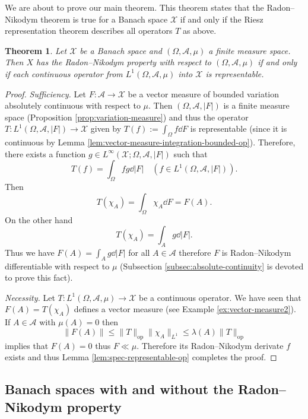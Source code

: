 \documentclass[a4paper, 12pt]{article}
\newtheorem{theo}[lem]{Theorem}
\begin{document}
We are about to prove our main theorem. This theorem states that the Radon\---Nikodym theorem is true for a Banach space $\mathcal{X}$ if and only if the Riesz representation theorem describes all operators $T$ as above.
\begin{theo}\label{theo:main-result} Let $\mathcal{X}$ be a Banach space and $(\Omega, \mathcal{A}, \mu)$ a finite measure space. Then $X$ has the Radon\---Nikodym property with respect to $(\Omega, \mathcal{A}, \mu)$ if and only if each continuous operator from $L^1(\Omega, \mathcal{A}, \mu)$ into $\mathcal{X}$ is representable.
\end{theo}
\begin{proof}
\emph{Sufficiency.} Let $F \colon \mathcal{A} \to \mathcal{X}$ be a vector measure of bounded variation absolutely continuous with respect to $\mu$. Then $(\Omega, \mathcal{A},|F|)$ is a finite measure space (Proposition \ref{prop:variation-measure}) and thus the operator $T\colon L^1(\Omega, \mathcal{A},|F|) \to \mathcal{X}$  given by $T(f) := \int_{\Omega} f \dd{F}$ is representable (since it is continuous by Lemma \ref{lem:vector-measure-integration-bounded-op}). Therefore, there exists a function $g \in L^\infty(\mathcal{X} ;\Omega, \mathcal{A},|F|)$ such that
$$T(f)= \int_{\Omega} f g \dd{|F|} \quad (f \in L^1(\Omega, \mathcal{A},|F|)).$$
Then 
$$T(\chi_A) = \int_{\Omega} \chi_A \dd{F} = F(A).$$
On the other hand
$$T(\chi_A) = \int_{A} g \dd{|F|}.$$
Thus we have $F(A) = \int_{A} g \dd{|F|}$ for all $A \in \mathcal{A}$ therefore $F$ is Radon\---Nikodym differentiable with respect to $\mu$ (Subsection \ref{subsec:absolute-continuity} is devoted to prove this fact).

\emph{Necessity.} Let $T \colon L^1(\Omega, \mathcal{A}, \mu) \to \mathcal{X}$ be a continuous operator. We have seen that $F(A) = T(\chi_{A})$ defines a vector measure (see Example \ref{ex:vector-measure2}). If $A \in \mathcal{A}$ with $\mu(A) = 0$ then
$$\| F(A) \| \leqslant \|T\|_{\mathrm{op}}\| \chi_{A} \|_{L^1} \leqslant \lambda(A) \|T\|_{\mathrm{op}}$$
implies that $F(A) = 0$ thus $F \ll \mu$. Therefore its Radon\---Nikodym derivate $f$ exists and thus Lemma \ref{lem:spec-representable-op} completes the proof.
\end{proof}

\subsection{Banach spaces with and without the Radon\---Nikodym property}
\end{document}
